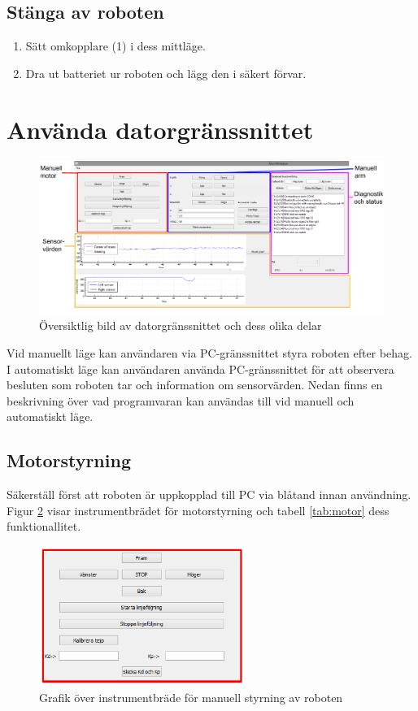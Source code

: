 \documentclass[a4paper,12pt]{article}
\begin{document}
\subsection{Stänga av roboten}
\begin{enumerate}
\item Sätt omkopplare (1) i dess mittläge.
\item Dra ut batteriet ur roboten och lägg den i säkert förvar.
\end{enumerate}
%
%
\section{Använda datorgränssnittet}

\begin{figure}[H]
	\centering
	\includegraphics[width=1.0\textwidth]{PC_manual.pdf}
	\caption{Översiktlig bild av datorgränssnittet och dess olika delar}
	\label{fig:pc_oversikt}
\end{figure}

Vid manuellt läge kan användaren via PC-gränssnittet styra roboten efter behag. I automatiskt läge kan användaren använda PC-gränssnittet för att observera besluten som roboten tar och information om sensorvärden. Nedan finns en beskrivning över vad programvaran kan användas till vid manuell och automatiskt läge. 

\subsection{Motorstyrning}
\label{subsec:motor}
Säkerställ först att roboten är uppkopplad till PC via blåtand innan användning. Figur \ref{fig:pc_motor} visar instrumentbrädet för motorstyrning och tabell \ref{tab:motor} dess funktionallitet.

\begin{figure}[H]
	\centering
	\includegraphics[width=0.6\textwidth]{man_motor1.pdf}
	\caption{Grafik över instrumentbräde för manuell styrning av roboten}
	\label{fig:pc_motor}
\end{figure}
\end{document}
